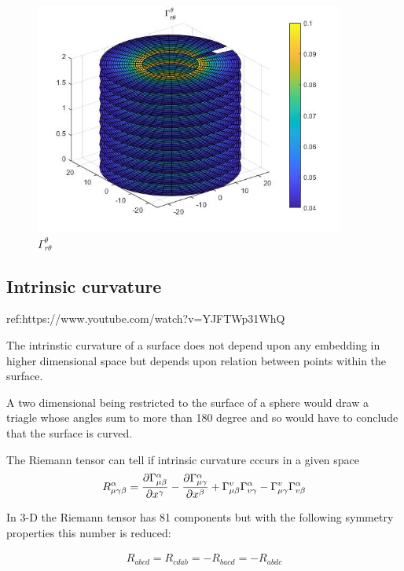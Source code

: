\documentclass{Note}
\begin{document}
\begin{figure}
  \centerline{\includegraphics[width=4in]{Gamma_r_theta^theta.jpg}}
  \caption{$\Gamma_{r\theta}^\theta$}
  \end{figure}
  



\subsection{Intrinsic curvature}

ref:https://www.youtube.com/watch?v=YJFTWp31WhQ

The intrinstic curvature of a surface does not depend upon any embedding in higher dimensional space but depends upon relation between points within the surface.

A two dimensional being restricted to the surface of a sphere would draw a triagle whose angles sum to more than 180 degree and so would have to conclude that the surface is curved.

The Riemann tensor can tell if intrinsic curvature cccurs in a given space
\begin{equation}
\begin{aligned}
R_{\mu\gamma\beta}^\alpha={{\partial \Gamma_{\mu\beta}^\alpha}\over \partial x^\gamma}-{{\partial \Gamma_{\mu\gamma}^\alpha}\over \partial x^\beta}+\Gamma_{\mu\beta}^v \Gamma_{v\gamma}^\alpha-\Gamma_{\mu\gamma}^v\Gamma_{v\beta}^\alpha
\end{aligned}
\end{equation}

In 3-D the Riemann tensor has 81 components but with the following symmetry properties this number is reduced:

\begin{equation}
\begin{aligned}
R_{abcd}=R_{cdab}=-R_{bacd}=-R_{abdc}
\end{aligned}
\end{equation}
\end{document}
